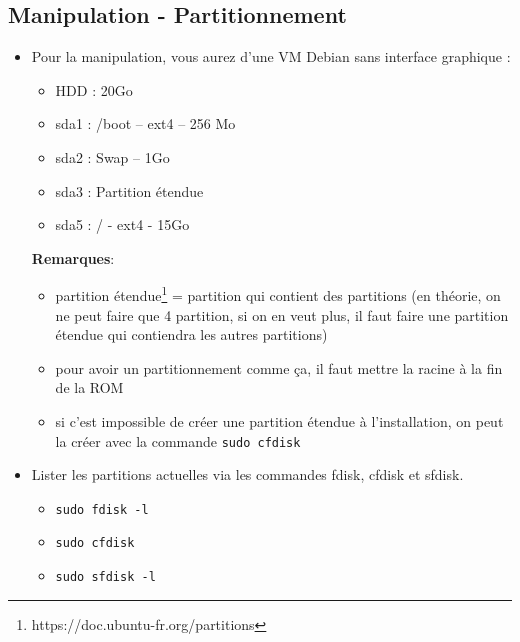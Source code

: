 \documentclass[a4paper]{article}
\begin{document}
\subsection{Manipulation - Partitionnement}





\begin{itemize}

\item Pour la manipulation, vous aurez d’une VM Debian sans interface graphique :
\begin{itemize}
    \item HDD : 20Go
    \item sda1 : /boot – ext4 – 256 Mo
    \item sda2 : Swap – 1Go
    \item sda3 : Partition étendue
    \item sda5 : / - ext4 - 15Go
\end{itemize}
\begin{example}
    \textbf{Remarques}:
    \begin{itemize}
        \item partition étendue\footnote{https://doc.ubuntu-fr.org/partitions} = partition qui contient des partitions (en théorie, on ne peut faire que 4 partition, si on en veut plus, il faut faire une partition étendue qui contiendra les autres partitions)
        \item pour avoir un partitionnement comme ça, il faut mettre la racine à la fin de la ROM
        \item si c'est impossible de créer une partition étendue à l'installation, on peut la créer avec la commande \texttt{sudo cfdisk}
    \end{itemize}
\end{example}

\item Lister les partitions actuelles via les commandes fdisk, cfdisk et sfdisk.
\begin{example}
    \begin{itemize}
        \item \texttt{sudo fdisk -l}
        \item \texttt{sudo cfdisk}
        \item \texttt{sudo sfdisk -l}
    \end{itemize}
\end{example}


\end{itemize}
\end{document}
